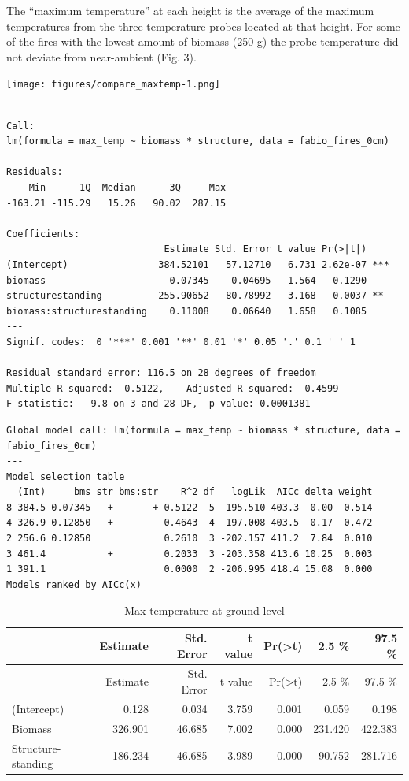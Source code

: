\documentclass[11pt,a4paper]{article}
\begin{document}
The ``maximum temperature'' at each height is the average of the maximum
temperatures from the three temperature probes located at that height.
For some of the fires with the lowest amount of biomass (250 g) the
probe temperature did not deviate from near-ambient (Fig. 3).

\texttt{[image: figures/compare\_maxtemp-1.png]}

\begin{verbatim}

Call:
lm(formula = max_temp ~ biomass * structure, data = fabio_fires_0cm)

Residuals:
    Min      1Q  Median      3Q     Max 
-163.21 -115.29   15.26   90.02  287.15 

Coefficients:
                            Estimate Std. Error t value Pr(>|t|)    
(Intercept)                384.52101   57.12710   6.731 2.62e-07 ***
biomass                      0.07345    0.04695   1.564   0.1290    
structurestanding         -255.90652   80.78992  -3.168   0.0037 ** 
biomass:structurestanding    0.11008    0.06640   1.658   0.1085    
---
Signif. codes:  0 '***' 0.001 '**' 0.01 '*' 0.05 '.' 0.1 ' ' 1

Residual standard error: 116.5 on 28 degrees of freedom
Multiple R-squared:  0.5122,    Adjusted R-squared:  0.4599 
F-statistic:   9.8 on 3 and 28 DF,  p-value: 0.0001381
\end{verbatim}

\begin{verbatim}
Global model call: lm(formula = max_temp ~ biomass * structure, data = fabio_fires_0cm)
---
Model selection table 
  (Int)     bms str bms:str    R^2 df   logLik  AICc delta weight
8 384.5 0.07345   +       + 0.5122  5 -195.510 403.3  0.00  0.514
4 326.9 0.12850   +         0.4643  4 -197.008 403.5  0.17  0.472
2 256.6 0.12850             0.2610  3 -202.157 411.2  7.84  0.010
3 461.4           +         0.2033  3 -203.358 413.6 10.25  0.003
1 391.1                     0.0000  2 -206.995 418.4 15.08  0.000
Models ranked by AICc(x) 
\end{verbatim}

\begin{longtable}[]{@{}lrrrrrr@{}}
\caption{Max temperature at ground level}\tabularnewline
\toprule
& Estimate & Std. Error & t value &
Pr(\textgreater{}\textbar{}t\textbar{}) & 2.5 \% & 97.5
\%\tabularnewline
\midrule
\endfirsthead
\toprule
& Estimate & Std. Error & t value &
Pr(\textgreater{}\textbar{}t\textbar{}) & 2.5 \% & 97.5
\%\tabularnewline
\midrule
\endhead
(Intercept) & 0.128 & 0.034 & 3.759 & 0.001 & 0.059 &
0.198\tabularnewline
Biomass & 326.901 & 46.685 & 7.002 & 0.000 & 231.420 &
422.383\tabularnewline
Structure-standing & 186.234 & 46.685 & 3.989 & 0.000 & 90.752 &
281.716\tabularnewline
\bottomrule
\end{longtable}
\end{document}
